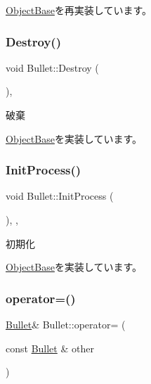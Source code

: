 \mbox{\hyperlink{class_object_base_ad772d7a42f5e46c39481f5db22ee8193}{Object\+Base}}を再実装しています。

\mbox{\label{class_bullet_a09a92c6b924fb6bc38e18f6c41ac20ff}} 
\subsubsection{\texorpdfstring{Destroy()}{Destroy()}}
{\footnotesize\ttfamily void Bullet\+::\+Destroy (\begin{DoxyParamCaption}{ }\end{DoxyParamCaption})\hspace{0.3cm}{\ttfamily [final]}, {\ttfamily [virtual]}}



破棄 



\mbox{\hyperlink{class_object_base_a7fa4c548153c3af20f89673ffea809af}{Object\+Base}}を実装しています。

\mbox{\label{class_bullet_a448c1c566e002d7b51ba6ed5c927bff7}} 
\subsubsection{\texorpdfstring{Init\+Process()}{InitProcess()}}
{\footnotesize\ttfamily void Bullet\+::\+Init\+Process (\begin{DoxyParamCaption}{ }\end{DoxyParamCaption})\hspace{0.3cm}{\ttfamily [final]}, {\ttfamily [protected]}, {\ttfamily [virtual]}}



初期化 



\mbox{\hyperlink{class_object_base_af133f36f2bca1dcfd962e2cfac61ab51}{Object\+Base}}を実装しています。

\mbox{\label{class_bullet_a2a98443028be8389c0eb9da9a09f661c}} 
\subsubsection{\texorpdfstring{operator=()}{operator=()}}
{\footnotesize\ttfamily \mbox{\hyperlink{class_bullet}{Bullet}}\& Bullet\+::operator= (\begin{DoxyParamCaption}\item[{const \mbox{\hyperlink{class_bullet}{Bullet}} \&}]{other }\end{DoxyParamCaption})\hspace{0.3cm}{\ttfamily [inline]}}



